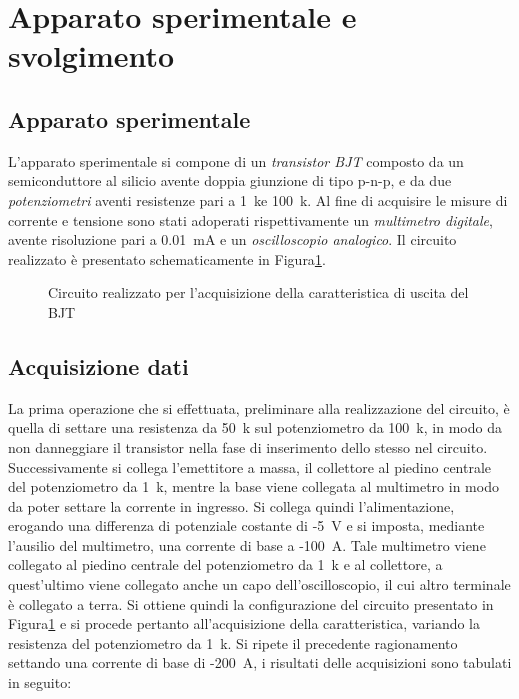 \documentclass[../main.tex]{subfiles}
\begin{document}
    \section{Apparato sperimentale e svolgimento} \label{sec:acquisizione}

    \subsection{Apparato sperimentale}\label{subsec:apparato-sperimentale}

    L'apparato sperimentale si compone di un \textit{transistor BJT} composto da un
    semiconduttore al silicio avente doppia giunzione di tipo p-n-p, e da due
    \textit{potenziometri} aventi resistenze pari a 1~k\textohm\;e 100~k\textohm. Al fine di acquisire
    le misure di corrente e tensione sono stati adoperati rispettivamente un \textit{multimetro digitale},
    avente risoluzione pari a 0.01~mA e un \textit{oscilloscopio analogico}.
    Il circuito realizzato è presentato schematicamente in Figura\ref{fig:circuito}.

    \begin{figure}[h!]
        \centering
        
        \caption{Circuito realizzato per l'acquisizione della caratteristica di uscita del BJT}
        \label{fig:circuito}
    \end{figure}
    \newpage
    \subsection{Acquisizione dati}\label{subsec:acquisizione-dati}

    La prima operazione che si effettuata, preliminare alla realizzazione
    del circuito, è quella di settare una resistenza da 50~k\textohm\;
    sul potenziometro da 100~k\textohm, in modo da non danneggiare il
    transistor nella fase di inserimento dello stesso nel circuito. \\
    Successivamente si collega l'emettitore a massa, il collettore al piedino centrale
    del potenziometro da 1~k\textohm, mentre la base viene collegata al multimetro
    in modo da poter settare la corrente in ingresso. Si collega quindi
    l'alimentazione, erogando una differenza di potenziale costante di -5~V e
    si imposta, mediante l'ausilio del multimetro, una corrente di base
    a -100~\textmu A. Tale multimetro viene collegato al piedino
    centrale del potenziometro da 1~k\textohm\; e al collettore, a quest'ultimo
    viene collegato anche un capo dell'oscilloscopio, il cui altro terminale è collegato a terra.
    Si ottiene quindi la configurazione del circuito presentato in Figura\ref{fig:circuito} e si procede
    pertanto all'acquisizione della caratteristica, variando la
    resistenza del potenziometro da 1~k\textohm.
    Si ripete il precedente ragionamento settando una corrente di base
    di -200~\textmu A, i risultati delle acquisizioni sono tabulati in seguito:
\end{document}

